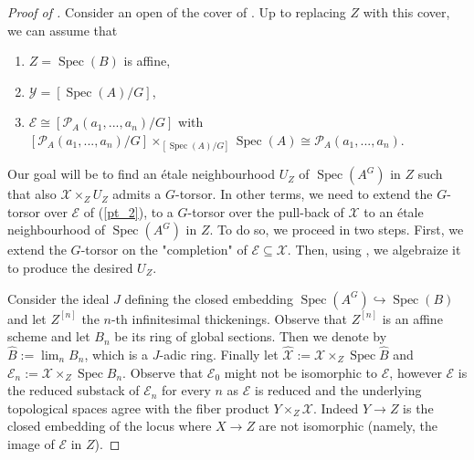 \documentclass{amsart}
\newcommand{\cB}{\mathcal{B}}
\newcommand{\cE}{\mathcal{E}}
\newcommand{\cP}{\mathcal{P}}
\newcommand{\cX}{\mathcal{X}}
\newcommand{\cY}{\mathcal{Y}}
\newcommand{\cZ}{\mathcal{Z}}
\newcommand{\spec}{\operatorname{Spec}}
\newcommand{\Hom}{\operatorname{Hom}}
\theoremstyle{definition}
\newtheorem{Oss}[theorem]{Remark}
\begin{document}
\begin{proof}[Proof of ]
Consider an open of the cover of . Up to replacing $Z$ with this cover, we can assume that 
\begin{enumerate}
\item $Z=\spec(B)$ is affine,
    \item $\cY=[\spec(A)/G]$,
    \item\label{pt_2} $\cE\cong [\cP_A(a_1,...,a_n)/G]$ with $[\cP_A(a_1,...,a_n)/G]\times_{[\spec(A)/G]}\spec(A)\cong \cP_A(a_1,...,a_n)$.
\end{enumerate}
Our goal will be to find an \'etale neighbourhood $U_Z$ of $\spec(A^G)$ in $Z$ such that also $\cX\times_ZU_Z$ admits a $G$-torsor.  In other terms, we need to extend the $G$-torsor over $\cE$ of (\ref{pt_2}), to a $G$-torsor over the pull-back of $\cX$ to an \'etale neighbourhood of $\spec(A^G)$ in $Z$. 
To do so, we proceed in two steps. First, we extend the $G$-torsor on the "completion" of $\cE\subseteq \cX$. Then, using \cite[Thm. 3.4]{AlperHallRydh}, we algebraize it to produce the desired $U_Z$.

 Consider the ideal $J$ defining the closed embedding $\spec(A^G) \hookrightarrow \spec(B)$ and let $Z^{[n]}$ the $n$-th infinitesimal thickenings. Observe that $Z^{[n]}$ is an affine scheme and let $B_n$ be its ring of global sections. Then we denote by $\widehat{B}:= \lim_n B_n$, which is a $J$-adic ring. Finally let $\widehat{\cX}:=\cX \times_Z \spec \widehat{B}$ and $\cE_n:=\cX \times_Z \spec B_n$. Observe that $\cE_0$ might not be isomorphic to $\cE$, however $\cE$ is the reduced substack of $\cE_n$ for every $n$ {as $\cE$ is reduced and the underlying topological spaces agree with the fiber product $Y\times_Z\cX$. Indeed $Y\to Z$ is the closed embedding of the locus where $X\to Z$ are not isomorphic (namely, the image of $\cE$ in $Z$)}.


\end{proof}
\end{document}
